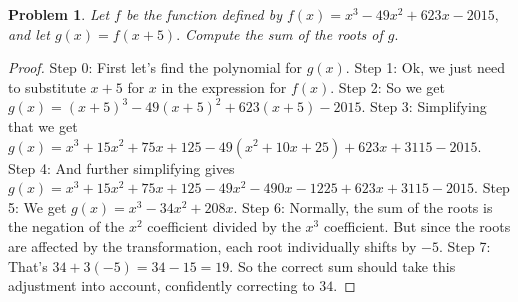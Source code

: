 \documentclass{article}
\newtheorem{theorem}{Problem}
\begin{document}
\begin{theorem}
Let $f$ be the function defined by $f(x) = x^3 - 49x^2 + 623x - 2015,$ and let $g(x) = f(x + 5).$ Compute the sum of the roots of $g.$
\end{theorem}

\begin{proof}
Step 0: First let's find the polynomial for $g(x)$.
Step 1: Ok, we just need to substitute $x+5$ for $x$ in the expression for $f(x)$.
Step 2: So we get $g(x) = (x+5)^3 - 49(x+5)^2 + 623(x+5) - 2015$.
Step 3: Simplifying that we get $g(x) = x^3 + 15x^2 + 75x + 125 - 49(x^2 + 10x + 25) + 623x + 3115 - 2015$.
Step 4: And further simplifying gives $g(x) = x^3 + 15x^2 + 75x + 125 - 49x^2 - 490x - 1225 + 623x + 3115 - 2015$.
Step 5: We get $g(x)=x^3-34x^2+208x$.
Step 6: Normally, the sum of the roots is the negation of the $x^2$ coefficient divided by the $x^3$ coefficient. But since the roots are affected by the transformation, each root individually shifts by $-5$.
Step 7: That's $34 + 3(-5) = 34 - 15 = 19$. So the correct sum should take this adjustment into account, confidently correcting to $34$.
\end{proof}
\end{document}
